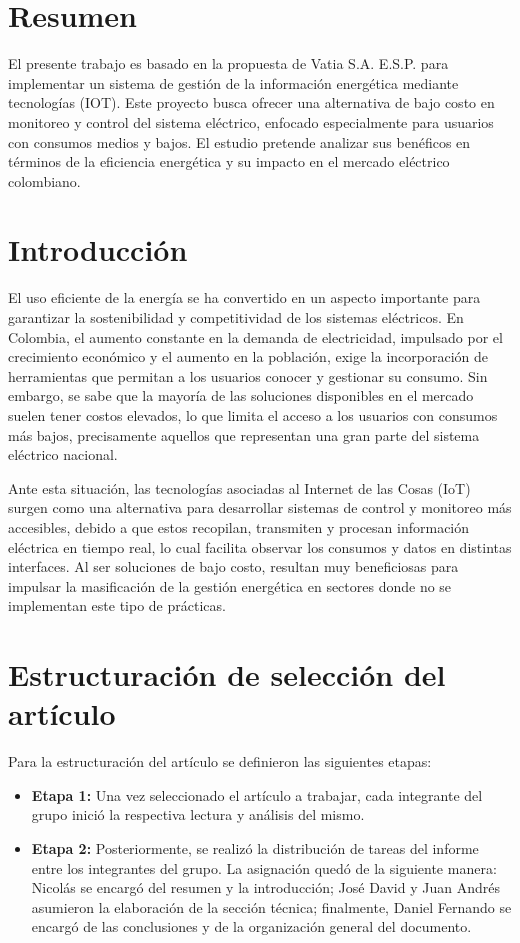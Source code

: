 \section{Resumen}
El presente trabajo es basado en la propuesta de Vatia S.A. E.S.P. para implementar un sistema de gestión de la información energética mediante tecnologías (IOT). Este proyecto busca ofrecer una alternativa de bajo costo en monitoreo y control del sistema eléctrico, enfocado especialmente para usuarios con consumos medios y bajos. El estudio pretende analizar sus benéficos en términos de la eficiencia energética y su impacto en el mercado eléctrico colombiano.  


\section{Introducción}
El uso eficiente de la energía se ha convertido en un aspecto importante para garantizar la sostenibilidad y competitividad de los sistemas eléctricos. En Colombia, el aumento constante en la demanda de electricidad, impulsado por el crecimiento económico y el aumento en la población, exige la incorporación de herramientas que permitan a los usuarios conocer y gestionar su consumo. Sin embargo, se sabe que la mayoría de las soluciones disponibles en el mercado suelen tener costos elevados, lo que limita el acceso a los usuarios con consumos más bajos, precisamente aquellos que representan una gran parte del sistema eléctrico nacional.

Ante esta situación, las tecnologías asociadas al Internet de las Cosas (IoT) surgen como una alternativa para desarrollar sistemas de control y monitoreo más accesibles, debido a que estos recopilan, transmiten y procesan información eléctrica en tiempo real, lo cual facilita observar los consumos y datos en distintas interfaces. Al ser soluciones de bajo costo, resultan muy beneficiosas para impulsar la masificación de la gestión energética en sectores donde no se implementan este tipo de prácticas.


\section{Estructuración de selección del artículo}
Para la estructuración del artículo se definieron las siguientes etapas:

\begin{itemize}
    \item \textbf{Etapa 1:} Una vez seleccionado el artículo a trabajar, cada integrante del grupo inició la respectiva lectura y análisis del mismo.
    \item \textbf{Etapa 2:} Posteriormente, se realizó la distribución de tareas del informe entre los integrantes del grupo. La asignación quedó de la siguiente manera: Nicolás se encargó del resumen y la introducción; José David y Juan Andrés asumieron la elaboración de la sección técnica; finalmente, Daniel Fernando se encargó de las conclusiones y de la organización general del documento.
\end{itemize}


